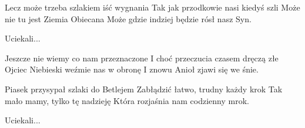\documentclass[../../../songbook.tex]{subfiles}
\begin{document}
Lecz może trzeba szlakiem iść wygnania			\newline
Tak jak przodkowie nasi kiedyś szli			\newline
Może nie tu jest Ziemia Obiecana			\newline
Może gdzie indziej będzie rósł nasz Syn.			\newline

\-\hspace{1cm}Uciekali...			\newline

Jeszcze nie wiemy co nam przeznaczone			\newline
I choć przeczucia czasem dręczą złe			\newline
Ojciec Niebieski weźmie nas w obronę			\newline
I znowu Anioł zjawi się we śnie.			\newline

Piasek przysypał szlaki do Betlejem			\newline
Zabłądzić łatwo, trudny każdy krok			\newline
Tak mało mamy, tylko tę nadzieję			\newline
Która rozjaśnia nam codzienny mrok.			\newline

\-\hspace{1cm}Uciekali...			\newline
\end{document}
